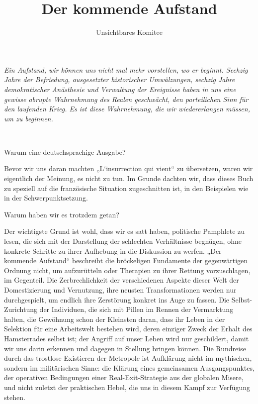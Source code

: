 \usepackage[ngerman,french]{babel}
\usepackage[T1]{fontenc}

\newcommand\extrapar\smallskip
\newcommand{\satz}[1]{#1\extrapar\noindent}

\setcounter{tocdepth}{1}



\title{Der kommende Aufstand}
\author{Unsichtbares Komitee}
\date{}
\maketitle

\textit{Ein Aufstand, wir können uns nicht mal mehr vorstellen, wo er 
beginnt. Sechzig Jahre der Befriedung, ausgesetzter historischer 
Umwälzungen, sechzig Jahre demokratischer Anästhesie und Verwaltung 
der Ereignisse haben in uns eine gewisse abrupte Wahrnehmung des Realen 
geschwächt, den parteilichen Sinn für den laufenden Krieg. Es ist diese 
Wahrnehmung, die wir wiedererlangen müssen, um zu beginnen.}

~

Warum eine deutschsprachige Ausgabe?

Bevor wir uns daran machten „L‘insurrection qui vient“ zu
übersetzen, waren wir eigentlich der Meinung, es nicht zu tun. Im
Grunde dachten wir, dass dieses Buch zu speziell auf die
französische Situation zugeschnitten ist, in den Beispielen wie in
der Schwerpunktsetzung.

Warum haben wir es trotzdem getan?

\extrapar{}

Der wichtigste Grund ist wohl, dass wir es satt haben, politische
Pamphlete zu lesen, die sich mit der Darstellung der schlechten
Verhältnisse begnügen, ohne konkrete Schritte zu ihrer Aufhebung in
die Diskussion zu werfen. „Der kommende Aufstand“ beschreibt die
bröckeligen Fundamente der gegenwärtigen Ordnung nicht, um
aufzurütteln oder Therapien zu ihrer Rettung vorzuschlagen, im
Gegenteil. Die Zerbrechlichkeit der verschiedenen Aspekte dieser
Welt der Domestizierung und Vernutzung, ihre neusten
Transformationen werden nur durchgespielt, um endlich ihre
Zerstörung konkret ins Auge zu fassen. Die Selbst-Zurichtung der
Individuen, die sich mit Pillen im Rennen der Vermarktung halten,
die Gewöhnung schon der Kleinsten daran, dass ihr Leben in der
Selektion für eine Arbeitswelt bestehen wird, deren einziger Zweck
der Erhalt des Hamsterrades selbst ist; der Angriff auf unser Leben
wird nur geschildert, damit wir uns darin erkennen und dagegen in
Stellung bringen können. Die Rundreise durch das trostlose
Existieren der Metropole ist Aufklärung nicht im mythischen,
sondern im militärischen Sinne: die Klärung eines gemeinsamen
Ausgangspunktes, der operativen Bedingungen einer
Real-Exit-Strategie aus der globalen Misere, und nicht zuletzt der
praktischen Hebel, die uns in diesem Kampf zur Verfügung stehen.
\extrapar{}

